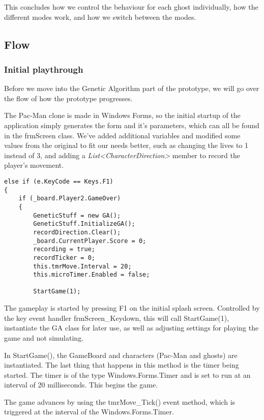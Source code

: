 This concludes how we control the behaviour for each ghost individually, how the different modes work, and how we switch between the modes.

\subsection{Flow}
\subsubsection*{Initial playthrough}
Before we move into the Genetic Algorithm part of the prototype, we will go over the flow of how the prototype progresses.

The Pac-Man clone is made in Windows Forms, so the initial startup of the application simply generates the form and it’s parameters, which can all be found in the frmScreen class. We’ve added additional variables and modified some values from the original to fit our needs better, such as changing the lives to 1 instead of 3, and adding a \emph{List<CharacterDirection>} member to record the player’s movement.

\begin{lstlisting}[caption=Snippet of frmScreen.cs taken from the key event handler, label=lst:keyEvent]
else if (e.KeyCode == Keys.F1)
{
	if (_board.Player2.GameOver)
	{
		GeneticStuff = new GA();
		GeneticStuff.InitializeGA();
		recordDirection.Clear();
		_board.CurrentPlayer.Score = 0;
		recording = true;
		recordTicker = 0;
		this.tmrMove.Interval = 20;
		this.microTimer.Enabled = false;

		StartGame(1);
\end{lstlisting}

The gameplay is started by pressing F1 on the initial splash screen.
Controlled by the key event handler frmScreen\_Keydown, this will call StartGame(1), instantiate the GA
 class for later use, as well as adjusting settings for playing the game and not simulating.

In StartGame(),  the GameBoard and characters (Pac-Man and ghosts) are instantiated. The last thing that happens in this method is the timer being started. The timer is of the type Windows.Forms.Timer and is set to run at an interval of 20 milliseconds. This begins the game.

The game advances by using the tmrMove\_Tick() event method, which is triggered at the interval of the Windows.Forms.Timer.

